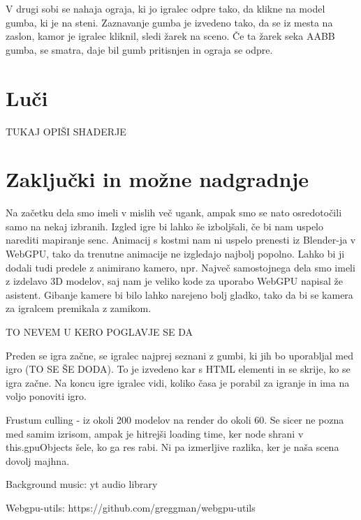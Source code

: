\documentclass[a4paper,12pt]{article}
\begin{document}
V drugi sobi se nahaja ograja, ki jo igralec odpre tako, da klikne na model gumba, ki je na steni. Zaznavanje gumba je izvedeno tako, da se iz mesta na zaslon, kamor je igralec kliknil, sledi žarek na sceno. Če ta žarek seka AABB gumba, se smatra, daje bil gumb pritisnjen in ograja se odpre.

\section{Luči}
TUKAJ OPIŠI SHADERJE

\newpage

\section{Zaključki in možne nadgradnje}
\noindent Na začetku dela smo imeli v mislih več ugank, ampak smo se nato osredotočili samo na nekaj izbranih. Izgled igre bi lahko še izboljšali, če bi nam uspelo narediti mapiranje senc. Animacij s kostmi nam ni uspelo prenesti iz Blender-ja v WebGPU, tako da trenutne animacije ne izgledajo najbolj popolno. Lahko bi ji dodali tudi predele z animirano kamero, npr. Največ samostojnega dela smo imeli z izdelavo 3D modelov, saj nam je veliko kode za uporabo WebGPU napisal že asistent.
Gibanje kamere bi bilo lahko narejeno bolj gladko, tako da bi se kamera za igralcem premikala z zamikom.

 \newpage
 
 TO NEVEM U KERO POGLAVJE SE DA

Preden se igra začne, se igralec najprej seznani z gumbi, ki jih bo uporabljal med igro (TO SE ŠE DODA). To je izvedeno kar s HTML elementi in se skrije, ko se igra začne. Na koncu igre igralec vidi, koliko časa je porabil za igranje in ima na voljo ponoviti igro.

Frustum culling - iz okoli 200 modelov na render do okoli 60. Se sicer ne pozna med samim izrisom, ampak je hitrejši loading time, ker node shrani v this.gpuObjects šele, ko ga res rabi. Ni pa izmerljive razlika, ker je naša scena dovolj majhna.


Background music: yt audio library

Webgpu-utils: https://github.com/greggman/webgpu-utils
\end{document}
